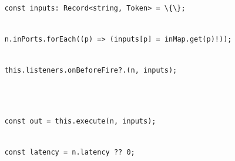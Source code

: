 \documentclass[
]{article}
\newcommand{\passthrough}[1]{#1}
\begin{document}
\strut \\
\passthrough{\lstinline!    !}\passthrough{\lstinline!const!}\passthrough{\lstinline! !}\passthrough{\lstinline!inputs!}\passthrough{\lstinline!:!}\passthrough{\lstinline! !}\passthrough{\lstinline!Record!}\passthrough{\lstinline!<!}\passthrough{\lstinline!string!}\passthrough{\lstinline!,!}\passthrough{\lstinline! !}\passthrough{\lstinline!Token!}\passthrough{\lstinline!>!}\passthrough{\lstinline! !}\passthrough{\lstinline!=!}\passthrough{\lstinline! !}\passthrough{\lstinline!\{\};!}\strut \\
\passthrough{\lstinline!    !}\passthrough{\lstinline!n!}\passthrough{\lstinline!.!}\passthrough{\lstinline!inPorts!}\passthrough{\lstinline!.!}\passthrough{\lstinline!forEach!}\passthrough{\lstinline!((!}\passthrough{\lstinline!p!}\passthrough{\lstinline!)!}\passthrough{\lstinline! !}\passthrough{\lstinline!=>!}\passthrough{\lstinline! !}\passthrough{\lstinline!(!}\passthrough{\lstinline!inputs!}\passthrough{\lstinline![!}\passthrough{\lstinline!p!}\passthrough{\lstinline!]!}\passthrough{\lstinline! !}\passthrough{\lstinline!=!}\passthrough{\lstinline! !}\passthrough{\lstinline!inMap!}\passthrough{\lstinline!.!}\passthrough{\lstinline!get!}\passthrough{\lstinline!(!}\passthrough{\lstinline!p!}\passthrough{\lstinline")!));"}\strut \\
\passthrough{\lstinline!    !}\passthrough{\lstinline!this!}\passthrough{\lstinline!.!}\passthrough{\lstinline!listeners!}\passthrough{\lstinline!.!}\passthrough{\lstinline!onBeforeFire!}\passthrough{\lstinline!?.(!}\passthrough{\lstinline!n!}\passthrough{\lstinline!,!}\passthrough{\lstinline! !}\passthrough{\lstinline!inputs!}\passthrough{\lstinline!);!}\strut \\
\strut \\
\passthrough{\lstinline!    !}\passthrough{\lstinline!const!}\passthrough{\lstinline! !}\passthrough{\lstinline!out!}\passthrough{\lstinline! !}\passthrough{\lstinline!=!}\passthrough{\lstinline! !}\passthrough{\lstinline!this!}\passthrough{\lstinline!.!}\passthrough{\lstinline!execute!}\passthrough{\lstinline!(!}\passthrough{\lstinline!n!}\passthrough{\lstinline!,!}\passthrough{\lstinline! !}\passthrough{\lstinline!inputs!}\passthrough{\lstinline!);!}\strut \\
\passthrough{\lstinline!    !}\passthrough{\lstinline!const!}\passthrough{\lstinline! !}\passthrough{\lstinline!latency!}\passthrough{\lstinline! !}\passthrough{\lstinline!=!}\passthrough{\lstinline! !}\passthrough{\lstinline!n!}\passthrough{\lstinline!.!}\passthrough{\lstinline!latency!}\passthrough{\lstinline! !}\passthrough{\lstinline!??!}\passthrough{\lstinline! !}\passthrough{\lstinline!0;!}\strut \\
\end{document}
